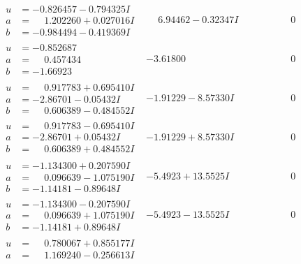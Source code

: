 \documentclass[1p]{elsarticle_modified}
\theoremstyle{definition}
\begin{document}
$$\begin{array}{c|c|c}
 \hline 
\begin{aligned}
u &= -0.826457 - 0.794325 I \\
a &= \phantom{-}1.202260 + 0.027016 I \\
b &= -0.984494 - 0.419369 I\end{aligned}
 & \phantom{-}6.94462 - 0.32347 I & \phantom{-0.000000 } 0 \\ \hline\begin{aligned}
u &= -0.852687\phantom{ +0.000000I} \\
a &= \phantom{-}0.457434\phantom{ +0.000000I} \\
b &= -1.66923\phantom{ +0.000000I}\end{aligned}
 & -3.61800\phantom{ +0.000000I} & \phantom{-0.000000 } 0 \\ \hline\begin{aligned}
u &= \phantom{-}0.917783 + 0.695410 I \\
a &= -2.86701 - 0.05432 I \\
b &= \phantom{-}0.606389 - 0.484552 I\end{aligned}
 & -1.91229 - 8.57330 I & \phantom{-0.000000 } 0 \\ \hline\begin{aligned}
u &= \phantom{-}0.917783 - 0.695410 I \\
a &= -2.86701 + 0.05432 I \\
b &= \phantom{-}0.606389 + 0.484552 I\end{aligned}
 & -1.91229 + 8.57330 I & \phantom{-0.000000 } 0 \\ \hline\begin{aligned}
u &= -1.134300 + 0.207590 I \\
a &= \phantom{-}0.096639 - 1.075190 I \\
b &= -1.14181 - 0.89648 I\end{aligned}
 & -5.4923 + 13.5525 I & \phantom{-0.000000 } 0 \\ \hline\begin{aligned}
u &= -1.134300 - 0.207590 I \\
a &= \phantom{-}0.096639 + 1.075190 I \\
b &= -1.14181 + 0.89648 I\end{aligned}
 & -5.4923 - 13.5525 I & \phantom{-0.000000 } 0 \\ \hline\begin{aligned}
u &= \phantom{-}0.780067 + 0.855177 I \\
a &= \phantom{-}1.169240 - 0.256613 I \\

\end{aligned}
\end{array}$$
\end{document}
